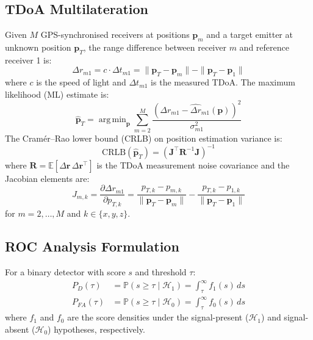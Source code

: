 \documentclass[sensors,article,submit,pdftex]{mdpi}
\newcommand{\vect}[1]{\boldsymbol{#1}}
\newcommand{\mat}[1]{\mathbf{#1}}
\newcommand{\E}{\mathbb{E}}
\newcommand{\Prob}{\mathbb{P}}
\DeclareMathOperator*{\argmin}{arg\,min}
\begin{document}
\subsection{TDoA Multilateration}
Given $M$ GPS-synchronised receivers at positions $\vect{p}_m$ and a target emitter at unknown position $\vect{p}_T$, the range difference between receiver $m$ and reference receiver 1 is:
\begin{equation}
    \Delta r_{m1} = c \cdot \Delta t_{m1} = \|\vect{p}_T - \vect{p}_m\| - \|\vect{p}_T - \vect{p}_1\|
    \label{eq:tdoa}
\end{equation}
where $c$ is the speed of light and $\Delta t_{m1}$ is the measured TDoA. The maximum likelihood (ML) estimate is:
\begin{equation}
    \hat{\vect{p}}_T = \argmin_{\vect{p}} \sum_{m=2}^{M} \frac{(\Delta r_{m1} - \hat{\Delta r}_{m1}(\vect{p}))^2}{\sigma_{m1}^2}
    \label{eq:tdoa_ml}
\end{equation}
The Cram\'{e}r--Rao lower bound (CRLB) on position estimation variance is:
\begin{equation}
    \text{CRLB}(\hat{\vect{p}}_T) = \left( \mat{J}^\top \mat{R}^{-1} \mat{J} \right)^{-1}
    \label{eq:crlb}
\end{equation}
where $\mat{R} = \E[\Delta\vect{r}\,\Delta\vect{r}^\top]$ is the TDoA measurement noise covariance and the Jacobian elements are:
\begin{equation}
    J_{m,k} = \frac{\partial \Delta r_{m1}}{\partial p_{T,k}} = \frac{p_{T,k} - p_{m,k}}{\|\vect{p}_T - \vect{p}_m\|} - \frac{p_{T,k} - p_{1,k}}{\|\vect{p}_T - \vect{p}_1\|}
    \label{eq:jacobian}
\end{equation}
for $m = 2, \ldots, M$ and $k \in \{x, y, z\}$.

\subsection{ROC Analysis Formulation}
For a binary detector with score $s$ and threshold $\tau$:
\begin{align}
    P_D(\tau) &= \Prob(s \geq \tau \mid \mathcal{H}_1) = \int_{\tau}^{\infty} f_1(s)\, ds \label{eq:pd} \\
    P_{FA}(\tau) &= \Prob(s \geq \tau \mid \mathcal{H}_0) = \int_{\tau}^{\infty} f_0(s)\, ds \label{eq:pfa}
\end{align}
where $f_1$ and $f_0$ are the score densities under the signal-present ($\mathcal{H}_1$) and signal-absent ($\mathcal{H}_0$) hypotheses, respectively.
\end{document}
